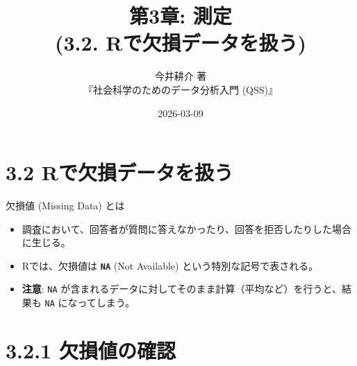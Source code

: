 \documentclass[
  ignorenonframetext,
]{beamer}
\title{第3章: 測定\\
(3.2. Rで欠損データを扱う)}
\subtitle{今井耕介 著\\
『社会科学のためのデータ分析入門 (QSS)』}
\author{}
\date{\vspace{-2.5em}2026-03-09}
\providecommand{\tightlist}{%
  \setlength{\itemsep}{0pt}\setlength{\parskip}{0pt}}
\begin{document}
\frame{\titlepage}

\hypertarget{rux3067ux6b20ux640dux30c7ux30fcux30bfux3092ux6271ux3046}{%
\section{3.2
Rで欠損データを扱う}\label{rux3067ux6b20ux640dux30c7ux30fcux30bfux3092ux6271ux3046}}

\begin{frame}[fragile]{欠損値 (Missing Data) とは}
\protect\hypertarget{ux6b20ux640dux5024-missing-data-ux3068ux306f}{}
\begin{itemize}
\tightlist
\item
  調査において、回答者が質問に答えなかったり、回答を拒否したりした場合に生じる。
\item
  Rでは、欠損値は \textbf{\texttt{NA}} (Not Available)
  という特別な記号で表される。
\item
  \textbf{注意}: \texttt{NA}
  が含まれるデータに対してそのまま計算（平均など）を行うと、結果も
  \texttt{NA} になってしまう。
\end{itemize}
\end{frame}

\hypertarget{ux6b20ux640dux5024ux306eux78baux8a8d}{%
\section{3.2.1
欠損値の確認}\label{ux6b20ux640dux5024ux306eux78baux8a8d}}
\end{document}
